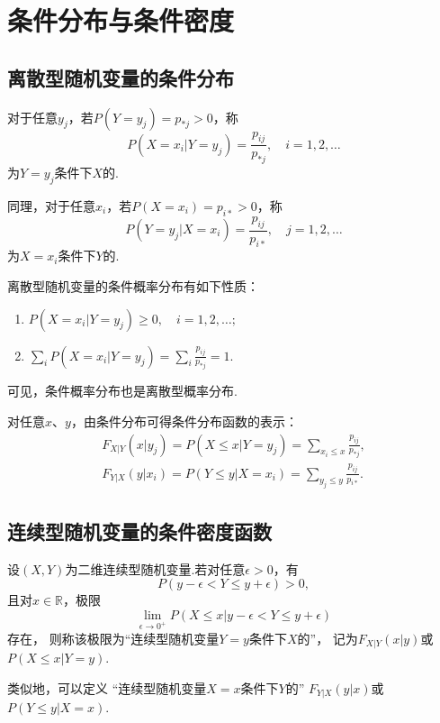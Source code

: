 \section{条件分布与条件密度}
\subsection{离散型随机变量的条件分布}
\begin{definition}
对于任意\(y_j\)，若\(P(Y=y_j) = p_{*j} > 0\)，称\[
P(X=x_i \vert Y=y_j) = \frac{p_{ij}}{p_{*j}}, \quad i=1,2,\dotsc
\]为\(Y=y_j\)条件下\(X\)的.

同理，对于任意\(x_i\)，若\(P(X=x_i) = p_{i*} > 0\)，称\[
P(Y=y_j \vert X=x_i) = \frac{p_{ij}}{p_{i*}}, \quad j=1,2,\dotsc
\]为\(X=x_i\)条件下\(Y\)的.
\end{definition}

\begin{property}
离散型随机变量的条件概率分布有如下性质：
\begin{enumerate}
\item \(P(X=x_i \vert Y=y_j) \geq 0, \quad i=1,2,\dotsc;\)
\item \(\sum_{i}{P(X=x_i \vert Y=y_j)} = \sum_{i}{\frac{p_{ij}}{p_{*j}}} = 1.\)
\end{enumerate}
可见，条件概率分布也是离散型概率分布.
\end{property}

\begin{theorem}
对任意\(x\)、\(y\)，由条件分布可得条件分布函数的表示：
\begin{align*}
F_{X \vert Y}(x \vert y_j) = P(X \leq x \vert Y=y_j) = \sum_{x_i \leq x}{\frac{p_{ij}}{p_{*j}}}, \\
F_{Y \vert X}(y \vert x_i) = P(Y \leq y \vert X=x_i) = \sum_{y_j \leq y}{\frac{p_{ij}}{p_{i*}}}.
\end{align*}
\end{theorem}

\subsection{连续型随机变量的条件密度函数}
\begin{definition}
设\((X,Y)\)为二维连续型随机变量.若对任意\(\epsilon > 0\)，有\[
P(y - \epsilon < Y \leq y + \epsilon) > 0,
\]且对\(x\in\mathbb{R}\)，极限\[
\lim\limits_{\epsilon\to0^+} P(X \leq x \vert y - \epsilon < Y \leq y + \epsilon)
\]存在，
则称该极限为“连续型随机变量\(Y=y\)条件下\(X\)的”，
记为\(F_{X \vert Y}(x \vert y)\)或\(P(X \leq x \vert Y = y)\).

类似地，可以定义%
“连续型随机变量\(X=x\)条件下\(Y\)的”%
\(F_{Y \vert X}(y \vert x)\)或\(P(Y \leq y \vert X = x)\).
\end{definition}

